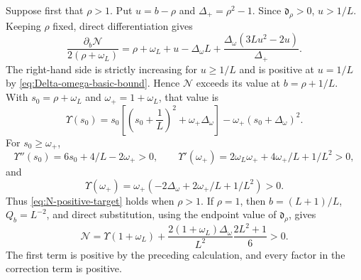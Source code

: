 \documentclass[10pt,twoside]{siamart1116}
\numberwithin{equation}{section}
\begin{document}
Suppose first that \(\rho>1\).  Put \(u=b-\rho\) and
\(\Delta_+=\rho^2-1\).  Since \(\mathfrak d_\rho>0\), \(u>1/L\).
Keeping \(\rho\) fixed,
direct differentiation gives
\[
 \frac{\partial_b\mathcal N}{2(\rho+\omega_L)}
 =\rho+\omega_L+u-\Delta_\omega L
 +\frac{\Delta_\omega(3Lu^2-2u)}{\Delta_+}.
\]
The right-hand side is strictly increasing for \(u\geq1/L\) and is positive
at \(u=1/L\) by \eqref{eq:Delta-omega-basic-bound}.  Hence \(\mathcal N\) exceeds
its value at
\(b=\rho+1/L\).  With
\(s_0=\rho+\omega_L\) and \(\omega_+=1+\omega_L\), that value is
\[
 \Upsilon(s_0)
 =s_0\left[\left(s_0+\frac1L\right)^2+\omega_+\Delta_\omega\right]
 -\omega_+(s_0+\Delta_\omega)^2.
\]
For \(s_0\geq\omega_+\),
\[
 \Upsilon''(s_0)=6s_0+4/L-2\omega_+>0,\qquad
 \Upsilon'(\omega_+)=2\omega_L\omega_++4\omega_+/L+1/L^2>0,
\]
and
\[
 \Upsilon(\omega_+)
 =\omega_+(-2\Delta_\omega+2\omega_+/L+1/L^2)>0.
\]
Thus \eqref{eq:N-positive-target} holds when \(\rho>1\).  If \(\rho=1\),
then \(b=(L+1)/L\), \(Q_b=L^{-2}\), and direct substitution, using the
endpoint value of \(\mathfrak d_\rho\), gives
\[
 \mathcal N=\Upsilon(1+\omega_L)
 +\frac{2(1+\omega_L)\Delta_\omega}{L^2}
   \frac{2L^2+1}{6}>0.
\]
The first term is positive by the preceding calculation, and every factor
in the correction term is positive.
\end{document}
